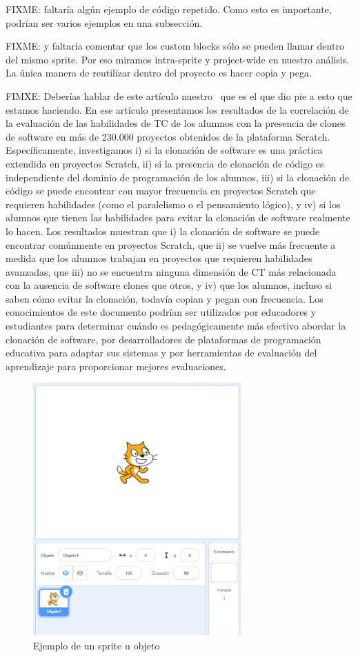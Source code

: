 \documentclass[a4paper, 12pt]{book}
\begin{document}
FIXME: faltaría algún ejemplo de código repetido. Como esto es importante, podrían ser varios ejemplos en una subsección.
 
FIXME: y faltaría comentar que los custom blocks sólo se pueden llamar dentro del mismo sprite. Por eso miramos intra-sprite y project-wide en nuestro análisis. La única manera de reutilizar dentro del proyecto es hacer copia y pega.

FIMXE:  Deberías hablar de este artículo nuestro~\cite{robles2017software} que es el que dio pie a esto que estamos haciendo. En ese artículo presentamos los resultados de la correlación de la evaluación de las habilidades de TC de los alumnos con la presencia de clones de software en más de 230.000 proyectos obtenidos de la plataforma Scratch. Específicamente, investigamos i) si la clonación de software es una práctica extendida en proyectos Scratch, ii) si la presencia de clonación de código es independiente del dominio de programación de los alumnos, iii) si la clonación de código se puede encontrar con mayor frecuencia en proyectos Scratch que requieren habilidades (como el paralelismo o el pensamiento lógico), y iv) si los alumnos que tienen las habilidades para evitar la clonación de software realmente lo hacen. Los resultados muestran que i) la clonación de software se puede encontrar comúnmente en proyectos Scratch, que ii) se vuelve más frecuente a medida que los alumnos trabajan en proyectos que requieren habilidades avanzadas, que iii) no se encuentra ninguna dimensión de CT más relacionada con la ausencia de software clones que otros, y iv) que los alumnos, incluso si saben cómo evitar la clonación, todavía copian y pegan con frecuencia. Los conocimientos de este documento podrían ser utilizados por educadores y estudiantes para determinar cuándo es pedagógicamente más efectivo abordar la clonación de software, por desarrolladores de plataformas de programación educativa para adaptar sus sistemas y por herramientas de evaluación del aprendizaje para proporcionar mejores evaluaciones.
 
\begin{figure}[htb!]
	\centering
    \includegraphics[width=8cm, keepaspectratio]{img/scratchsprite.jpg}
    \caption{Ejemplo de un sprite u objeto}
    \label{fig:scratchsprite}
\end{figure}
\end{document}
